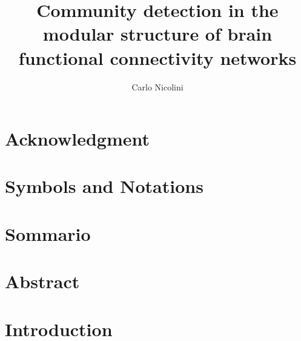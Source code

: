 
%

\title{Community detection in the modular structure of brain functional connectivity networks}
\author{Carlo Nicolini}


\newtheorem{obs}{Observation}
\newtheorem{props}{Proposition}
\newenvironment{bottompar}{\par\vspace*{\fill}}{\clearpage}




{}

\tableofcontents
\listoftodos

\chapter*{Acknowledgment}


\chapter*{Symbols and Notations}


% 
\chapter*{Sommario}



\chapter*{Abstract}


\chapter{Introduction}\label{chap:introduction}


